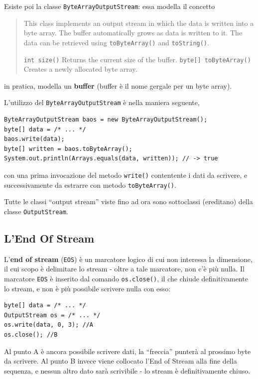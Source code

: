 \documentclass[\fontsizeclass,twocolumn]{\classname}
\theoremstyle{definition}
\theoremstyle{definition}
\begin{document}
Esiste poi la classe \texttt{ByteArrayOutputStream}: essa modella il concetto

\begin{quote}
    \footnotesize{This class implements an output stream in which the data is
    written into a byte array. The buffer automatically grows as data is
written to it. The data can be retrieved using \texttt{toByteArray()} and \texttt{toString()}.}

\texttt{int 	size()} 	Returns the current size of the buffer.
\texttt{byte[] 	toByteArray()} 	Creates a newly allocated byte array.
\end{quote}

in pratica, modella un \textbf{buffer} (buffer è il nome gergale per un byte
array).

L'utilizzo del \texttt{ByteArrayOutputStream} è nella maniera seguente,

\begin{lstlisting}
ByteArrayOutputStream baos = new ByteArrayOutputStream();
byte[] data = /* ... */
baos.write(data);
byte[] written = baos.toByteArray();
System.out.println(Arrays.equals(data, written)); // -> true
\end{lstlisting}

con una prima invocazione del metodo \texttt{write()} contentente i dati da
scrivere, e successivamente da estrarre con metodo \texttt{toByteArray()}.

Tutte le classi ``output stream'' viste fino ad ora sono sottoclassi
(ereditano) della classe \texttt{Output\-Stream}.

\subsection{L'End Of Stream}

L'\textbf{end of stream} (\texttt{EOS}) è un marcatore logico di cui non interessa la
dimensione, il cui scopo è delimitare lo stream \-- oltre a tale marcatore, non
c'è più nulla. Il marcatore \texttt{EOS} è inserito dal comando \texttt{os.close()}, il
che chiude definitivamente lo stream, e non è più possibile scrivere nulla con
esso:

\begin{lstlisting}
byte[] data = /* ... */
OutputStream os = /* ... */
os.write(data, 0, 3); //A
os.close(); //B
\end{lstlisting}

Al punto A è ancora possibile scrivere dati, la ``freccia'' punterà al prossimo
byte da scrivere. Al punto B invece viene collocato l'End of Stream alla fine
della sequenza, e nessun altro dato sarà scrivibile \-- lo stream è
definitivamente chiuso.
\end{document}
